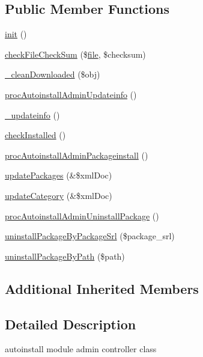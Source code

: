 \subsection*{Public Member Functions}
\begin{DoxyCompactItemize}
\item 
\hyperlink{classautoinstallAdminController_a0679d301d4f5cf35d76a62c4c7584828}{init} ()
\item 
\hyperlink{classautoinstallAdminController_a394c1fc9feab9953cbd5fd54e80c0ff7}{check\-File\-Check\-Sum} (\$\hyperlink{classfile}{file}, \$checksum)
\item 
\hyperlink{classautoinstallAdminController_af921268532a99f4a86c9979212279262}{\-\_\-clean\-Downloaded} (\$obj)
\item 
\hyperlink{classautoinstallAdminController_ac498f2779268ea03dd40799c72af90de}{proc\-Autoinstall\-Admin\-Updateinfo} ()
\item 
\hyperlink{classautoinstallAdminController_ad25ac25ebf81de31754b454b758e7d20}{\-\_\-updateinfo} ()
\item 
\hyperlink{classautoinstallAdminController_a1e6a0964fda3122f0361362af47df1bd}{check\-Installed} ()
\item 
\hyperlink{classautoinstallAdminController_af38130de594cfb4f33b6812a6a9f874d}{proc\-Autoinstall\-Admin\-Packageinstall} ()
\item 
\hyperlink{classautoinstallAdminController_a1e697b55343500fc590a78c93cd8ee54}{update\-Packages} (\&\$xml\-Doc)
\item 
\hyperlink{classautoinstallAdminController_aaf27c70ad29f65b99cb9d80af6376e37}{update\-Category} (\&\$xml\-Doc)
\item 
\hyperlink{classautoinstallAdminController_af289464bb0d9238e82962bd5ce74076f}{proc\-Autoinstall\-Admin\-Uninstall\-Package} ()
\item 
\hyperlink{classautoinstallAdminController_a8e385d2ac38d446a83429c50679e3750}{uninstall\-Package\-By\-Package\-Srl} (\$package\-\_\-srl)
\item 
\hyperlink{classautoinstallAdminController_ac52bb269b9e57d701b176615fa71faa5}{uninstall\-Package\-By\-Path} (\$path)
\end{DoxyCompactItemize}
\subsection*{Additional Inherited Members}


\subsection{Detailed Description}
autoinstall module admin controller class

